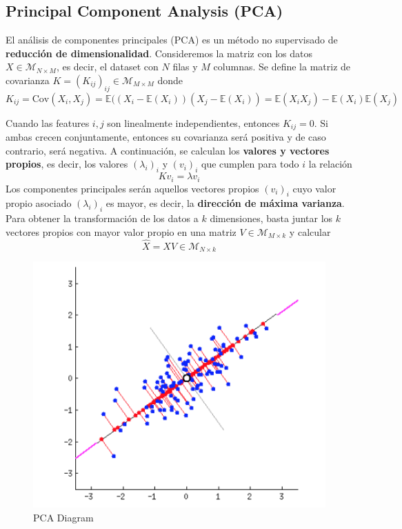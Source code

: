 \subsection{Principal Component Analysis (PCA)}

El análisis de componentes principales (PCA) es un método no supervisado de \textbf{reducción de dimensionalidad}. Consideremos la matriz con los datos $X \in \mathcal{M}_{N \times M}$, es decir, el dataset con $N$ filas y $M$ columnas. Se define la matriz de covarianza $K = (K_{ij})_{ij} \in \mathcal{M}_{M \times M}$ donde  
$$K_{ij} = \text{Cov}(X_i, X_j) = \mathbb{E}((X_i - \mathbb{E}(X_i))(X_j - \mathbb{E}(X_i)) = \mathbb{E}(X_iX_j) - \mathbb{E}(X_i)\mathbb{E}(X_j)$$

Cuando las features $i,j$ son linealmente independientes, entonces $K_{ij} = 0$. Si ambas crecen conjuntamente, entonces su covarianza será positiva y de caso contrario, será negativa. A continuación, se calculan los \textbf{valores y vectores propios}, es decir, los valores $(\lambda_i)_i$ y $(v_i)_i$ que cumplen para todo $i$ la relación 
$$
K v_i = \lambda v_i 
$$
Los componentes principales serán aquellos vectores propios $(v_i)_i$ cuyo valor propio asociado $(\lambda_i)_i$ es mayor, es decir, la \textbf{dirección de máxima varianza}. Para obtener la transformación de los datos a $k$ dimensiones, basta juntar los $k$ vectores propios con mayor valor propio en una matriz $V \in \mathcal{M}_{M \times k}$ y calcular 
$$ 
\hat{X} = XV \in \mathcal{M}_{N \times k}
$$
\begin{figure}[H]
    \center
    \includegraphics[scale=0.9]{notebooks/ML/img/pca_diagram.png}
    \caption{PCA Diagram}
\end{figure}
